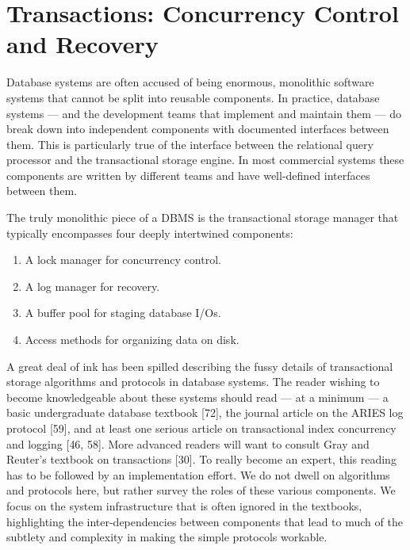 \documentclass[a4paper,11pt,twoside,openright]{book}
\begin{document}
\hypertarget{transactions-concurrency-control-and-recovery}{%
\chapter{Transactions: Concurrency Control and
Recovery}\label{transactions-concurrency-control-and-recovery}}

Database systems are often accused of being enormous, monolithic
software systems that cannot be split into reusable components. In
practice, database systems --- and the development teams that implement
and maintain them --- do break down into independent components with
documented interfaces between them. This is particularly true of the
interface between the relational query processor and the transactional
storage engine. In most commercial systems these components are written
by different teams and have well-defined interfaces between them.

The truly monolithic piece of a DBMS is the transactional storage
manager that typically encompasses four deeply intertwined components:

\begin{enumerate}
\def\labelenumi{\arabic{enumi}.}
\item
  A lock manager for concurrency control.
\item
  A log manager for recovery.
\item
  A buffer pool for staging database I/Os.
\item
  Access methods for organizing data on disk.
\end{enumerate}

A great deal of ink has been spilled describing the fussy details of
transactional storage algorithms and protocols in database systems. The
reader wishing to become knowledgeable about these systems should read
--- at a minimum --- a basic undergraduate database textbook {[}72{]},
the journal article on the ARIES log protocol {[}59{]}, and at least one
serious article on transactional index concurrency and logging {[}46,
58{]}. More advanced readers will want to consult Gray and Reuter's
textbook on transactions {[}30{]}. To really become an expert, this
reading has to be followed by an implementation effort. We do not dwell
on algorithms and protocols here, but rather survey the roles of these
various components. We focus on the system infrastructure that is often
ignored in the textbooks, highlighting the inter-dependencies between
components that lead to much of the subtlety and complexity in making
the simple protocols workable.
\end{document}
